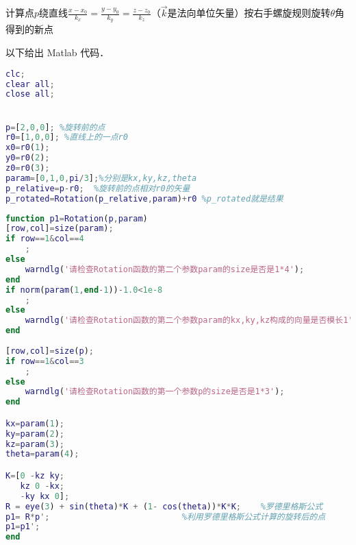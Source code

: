 
\begin{issues}
\issueDraft
\end{issues}


计算点$p$绕直线$\frac{x-x_0}{k_x}=\frac{y-y_0}{k_y}=\frac{z-z_0}{k_z}$（$\vec{k}$是法向单位矢量）按右手螺旋规则旋转$\theta$角得到的新点

以下给出 Matlab 代码．


\begin{lstlisting}[language=matlab]
%main.m
clc;
clear all;
close all;


p=[2,0,0]; %旋转前的点
r0=[1,0,0]; %直线上的一点r0
x0=r0(1);
y0=r0(2);
z0=r0(3);
param=[0,1,0,pi/3];%分别是kx,ky,kz,theta
p_relative=p-r0;  %旋转前的点相对r0的矢量
p_rotated=Rotation(p_relative,param)+r0 %p_rotated就是结果

\end{lstlisting}



\begin{lstlisting}[language=matlab]
% Rotaion.m
function p1=Rotation(p,param)
[row,col]=size(param);
if row==1&col==4 
    ;
else
    warndlg('请检查Rotation函数的第二个参数param的size是否是1*4');
end
if norm(param(1,end-1))-1.0<1e-8
    ;
else
    warndlg('请检查Rotation函数的第二个参数param的kx,ky,kz构成的向量是否模长1')
end   
    
[row,col]=size(p);
if row==1&col==3
    ;
else 
    warndlg('请检查Rotation函数的第一个参数p的size是否是1*3');
end

kx=param(1);
ky=param(2);
kz=param(3);
theta=param(4);

K=[0 -kz ky;
   kz 0 -kx;
   -ky kx 0];
R = eye(3) + sin(theta)*K + (1- cos(theta))*K*K;    %罗德里格斯公式
p1= R*p';                           %利用罗德里格斯公式计算的旋转后的点
p1=p1';
end
\end{lstlisting}

